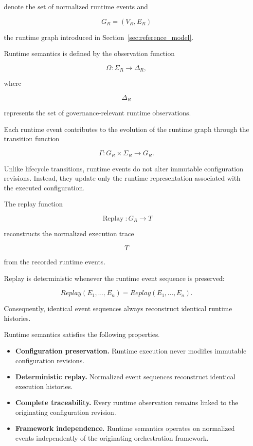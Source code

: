 \documentclass[10pt]{article}
\begin{document}
denote the set of normalized runtime events and

\[
G_R=(V_R,E_R)
\]

the runtime graph introduced in Section~\ref{sec:reference_model}.

Runtime semantics is defined by the observation function

\[
\Omega :
\Sigma_R
\rightarrow
\Delta_R,
\]

where

\[
\Delta_R
\]

represents the set of governance-relevant runtime observations.

Each runtime event contributes to the evolution of the runtime graph through the transition function

\[
\Gamma :
G_R
\times
\Sigma_R
\rightarrow
G_R.
\]

Unlike lifecycle transitions, runtime events do not alter immutable configuration revisions. Instead, they update only the runtime representation associated with the executed configuration.

The replay function

\[
\operatorname{Replay}
:
G_R
\rightarrow
T
\]

reconstructs the normalized execution trace

\[
T
\]

from the recorded runtime events.

Replay is deterministic whenever the runtime event sequence is preserved:

\[
Replay(E_1,\ldots,E_n)
=
Replay(E_1,\ldots,E_n).
\]

Consequently, identical event sequences always reconstruct identical runtime histories.

Runtime semantics satisfies the following properties.

\begin{itemize}

\item \textbf{Configuration preservation.}
Runtime execution never modifies immutable configuration revisions.

\item \textbf{Deterministic replay.}
Normalized event sequences reconstruct identical execution histories.

\item \textbf{Complete traceability.}
Every runtime observation remains linked to the originating configuration revision.

\item \textbf{Framework independence.}
Runtime semantics operates on normalized events independently of the originating orchestration framework.

\end{itemize}
\end{document}

